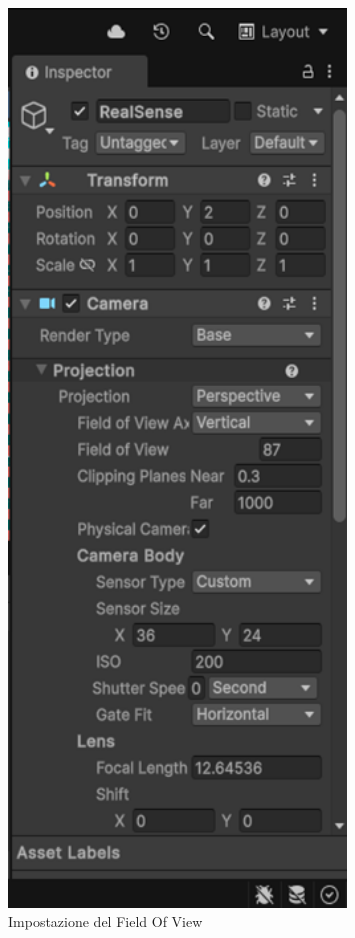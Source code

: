 \documentclass[11pt]{report}
\begin{document}
\begin{figure}[H]
    \centering
    \includegraphics[width=0.8\textwidth]{images/Immagine2.png}
    \caption{Impostazione del Field Of View}
    \label{fig:fov_setting}
\end{figure}
\end{document}
